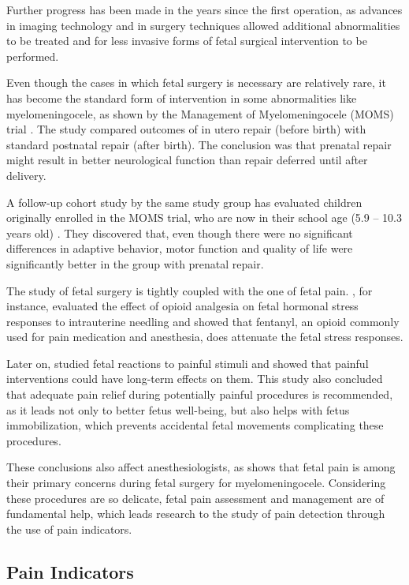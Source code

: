 Further progress has been made in the years since the first operation, as advances in imaging technology and in surgery techniques allowed additional abnormalities to be treated and for less invasive forms of fetal surgical intervention to be performed.

Even though the cases in which fetal surgery is necessary are relatively rare, it has become the standard form of intervention in some abnormalities like myelomeningocele, as shown by the Management of Myelomeningocele (MOMS) trial \citep{Adzick2011}. The study compared outcomes of in utero repair (before birth) with standard postnatal repair (after birth). The conclusion was that prenatal repair might result in better neurological function than repair deferred until after delivery.

A follow-up cohort study by the same study group has evaluated children originally enrolled in the MOMS trial, who are now in their school age (5.9 – 10.3 years old) \citep{Houtrow2020}. They discovered that, even though there were no significant differences in adaptive behavior, motor function and quality of life were significantly better in the group with prenatal repair.

The study of fetal surgery is tightly coupled with the one of fetal pain. \cite{Fisk2001}, for instance, evaluated the effect of opioid analgesia on fetal hormonal stress responses to intrauterine needling and showed that fentanyl, an opioid commonly used for pain medication and anesthesia, does attenuate the fetal stress responses.

Later on, \cite{vandeVelde2012} studied fetal reactions to painful stimuli and showed that painful interventions could have long-term effects on them. This study also concluded that adequate pain relief during potentially painful procedures is recommended, as it leads not only to better fetus well-being, but also helps with fetus immobilization, which prevents accidental fetal movements complicating these procedures. 

These conclusions also affect anesthesiologists, as \cite{Devoto2017} shows that fetal pain is among their primary concerns during fetal surgery for myelomeningocele. Considering these procedures are so delicate, fetal pain assessment and management are of fundamental help, which leads research to the study of pain detection through the use of pain indicators.

\subsection{Pain Indicators}

